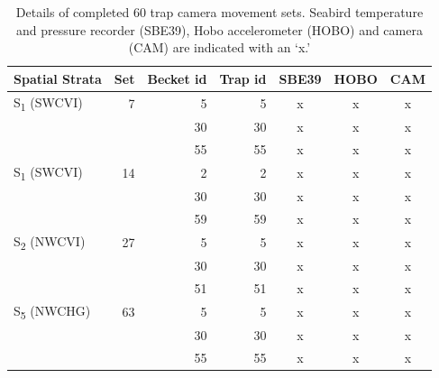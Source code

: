 \documentclass[12pt]{article}\usepackage[]{graphicx}\usepackage[]{color}
\begin{document}
\begin{table}[!h]

\caption{\label{tab:table3}Details of completed 60 trap camera movement sets. Seabird temperature and pressure recorder (SBE39), Hobo accelerometer (HOBO) and camera (CAM) are indicated with an `x.'}
\fontsize{9}{11}\selectfont
\begin{tabular}[t]{lrrrccc}
\toprule
\textbf{Spatial Strata} & \textbf{Set} & \textbf{Becket id} & \textbf{Trap id} & \textbf{SBE39} & \textbf{HOBO} & \textbf{CAM}\\
\midrule
S\textsubscript{1} (SWCVI) & 7 & 5 & 5 & x & x & x\\
 &  & 30 & 30 & x & x & \vphantom{3} x\\
 &  & 55 & 55 & x & x & \vphantom{1} x\\
\midrule
S\textsubscript{1} (SWCVI) & 14 & 2 & 2 & x & x & x\\
 &  & 30 & 30 & x & x & \vphantom{2} x\\
 &  & 59 & 59 & x & x & x\\
\midrule
S\textsubscript{2} (NWCVI) & 27 & 5 & 5 & x & x & x\\
 &  & 30 & 30 & x & x & \vphantom{1} x\\
 &  & 51 & 51 & x & x & x\\
\midrule
S\textsubscript{5} (NWCHG) & 63 & 5 & 5 & x & x & x\\
 &  & 30 & 30 & x & x & x\\
 &  & 55 & 55 & x & x & x\\
\bottomrule
\end{tabular}
\end{table}
\clearpage
\end{document}
